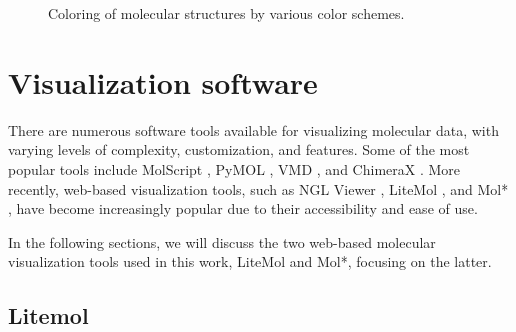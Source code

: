 \documentclass[
  digital,     %
  oneside,     %
  nosansbold,  %
  nocolorbold, %
  lof,         %
  lot,         %
]{fithesis4}
\begin{document}
\begin{figure}[htbp]
  \centering
  \caption{Coloring of molecular structures by various color schemes.}
  \label{fig:coloring}
\end{figure}

\section{Visualization software}
\label{section:visualization_software}


There are numerous software tools available for visualizing molecular data, with varying levels of complexity, customization, and features. Some of the most popular tools include MolScript \cite{kraulis1991molscript}, PyMOL \cite{delano2002pymol}, VMD \cite{humphrey1996vmd}, and ChimeraX \cite{goddard2018ucsf}. More recently, web-based visualization tools, such as NGL Viewer \cite{rose2015ngl}, LiteMol \cite{sehnal2017litemol}, and Mol* \cite{sehnal2021molstar}, have become increasingly popular due to their accessibility and ease of use.

In the following sections, we will discuss the two web-based molecular visualization tools used in this work, LiteMol and Mol*, focusing on the latter.

\subsection{Litemol}
\label{subsection:litemol}
\end{document}
